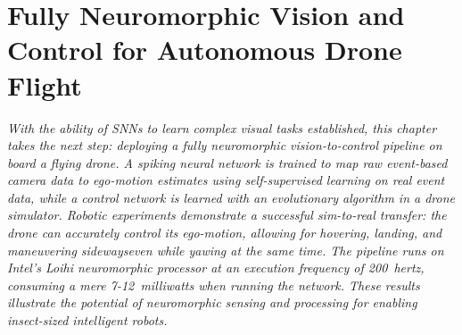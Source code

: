 \chapter{Fully Neuromorphic Vision and Control for Autonomous Drone Flight}
\label{ch:sr}

{\it
With the ability of SNNs to learn complex visual tasks established, this chapter takes the next step: deploying a fully neuromorphic vision-to-control pipeline on board a flying drone. A spiking neural network is trained to map raw event-based camera data to ego-motion estimates using self-supervised learning on real event data, while a control network is learned with an evolutionary algorithm in a drone simulator. Robotic experiments demonstrate a successful sim-to-real transfer: the drone can accurately control its ego-motion, allowing for hovering, landing, and maneuvering sideways\textemdash even while yawing at the same time. The pipeline runs on Intel's Loihi neuromorphic processor at an execution frequency of 200~hertz, consuming a mere 7-12~milliwatts when running the network. These results illustrate the potential of neuromorphic sensing and processing for enabling insect-sized intelligent robots.
}

